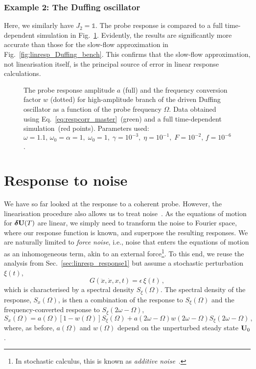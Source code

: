 \subsubsection{Example 2: The Duffing oscillator}

Here, we similarly have $J_2 =\mathbb{1}$. The probe response is compared to a full time-dependent simulation in Fig.~\ref{fig:respcorr_duff}. Evidently, the results are significantly more accurate than those for the slow-flow approximation in Fig.~\ref{fig:linresp_Duffing_bench}. This confirms that the slow-flow approximation, not linearisation itself, is the principal source of error in linear response calculations. 
\begin{figure} [h!]
	\centering
	
	\caption{The probe response amplitude $a$ (full) and the frequency conversion factor $w$ (dotted) for high-amplitude branch of the driven Duffing oscillator as a function of the probe frequency $\Omega$. Data obtained using Eq.~\eqref{eq:respcorr_master}~(green) and a full time-dependent simulation~(red points). Parameters used: $\omega=1.1,\,\omega_0 = \alpha = 1, \; \omega_0 = 1, \; \gamma = 10^{-3} , \; \eta = 10^{-1},\; F = 10^{-2},\,f = 10^{-6}$.}

	\label{fig:respcorr_duff}
\end{figure}

\section{Response to noise} 

We have so far looked at the response to a coherent probe. However, the linearisation procedure also allows us to treat noise~\cite{Ochs_2021, Huber_2020}. As the equations of motion for $\boldsymbol{\delta} \vb{U}(T)$ are linear, we simply need to transform the noise to Fourier space, where our response function is known, and superpose the resulting responses. We are naturally limited to \textit{force noise}, i.e., noise that enters the equations of motion as an inhomogeneous term, akin to an external force\footnote{In stochastic calculus, this is known as \textit{additive noise}~\cite{Gardiner}.}. To this end, we reuse the analysis from Sec.~\ref{sec:linresp_response1} but assume a stochastic perturbation $\xi(t)$,
\begin{equation}
G(\ddot{x}, \dot{x}, x, t) = \epsilon\, \xi(t)\,,
\end{equation}
which is characterised by a spectral density $S_{\xi}(\Omega)$. The spectral density of the response, $S_x(\Omega)$, is then a combination of the response to $S_{\xi}(\Omega)$ and the frequency-converted response to $S_{\xi}(2\omega - \Omega)$, 
\begin{equation} \label{eq:linresp_noise}
S_x(\Omega) = a(\Omega) \left[1 - w(\Omega) \right]S_{\xi}(\Omega) + a(2\omega - \Omega) w(2\omega - \Omega) S_{\xi}(2\omega-\Omega)\,,
\end{equation}
where, as before, $a(\Omega)$ and $w(\Omega)$ depend on the unperturbed steady state $\vb{U}_0$.

